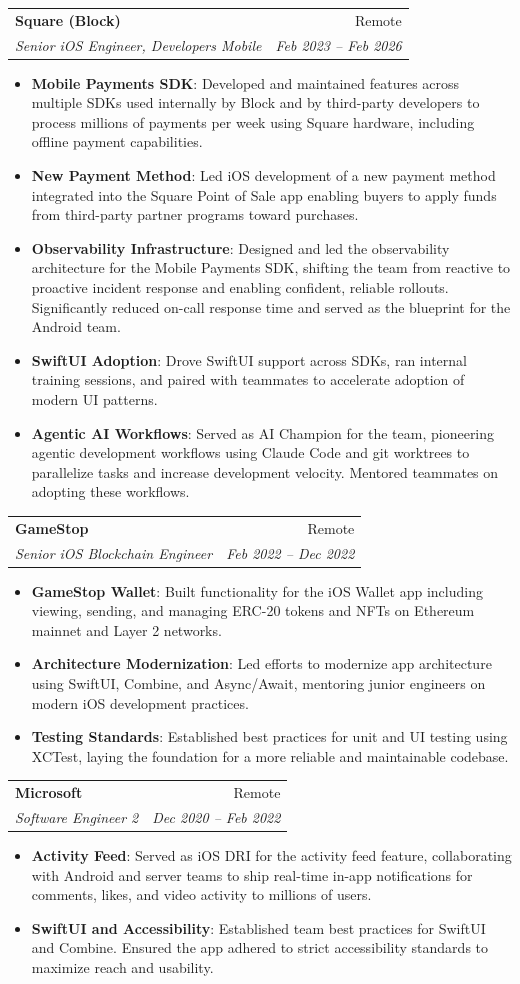 \documentclass[a4paper,20pt]{article}
\makeatletter
\newcommand{\resumeItem}[2]{
  \item\small{
    \textbf{#1}{: #2 \vspace{-2pt}}
  }
}
\newcommand{\resumeSubheading}[4]{
  \vspace{-1pt}\item
    \begin{tabular*}{0.97\textwidth}{l@{\extracolsep{\fill}}r}
      \textbf{#1} & #2 \\
      \textit{#3} & \textit{#4} \\
    \end{tabular*}\vspace{-5pt}
}
\newcommand{\resumeItemListStart}{\begin{itemize}}
\newcommand{\resumeItemListEnd}{\end{itemize}}
\makeatother
\begin{document}
    \resumeSubheading{Square (Block)}{Remote}
    {Senior iOS Engineer, Developers Mobile}{Feb 2023 -- Feb 2026}
    \resumeItemListStart
        \resumeItem{Mobile Payments SDK}
          {Developed and maintained features across multiple SDKs used internally by Block and by third-party developers to process millions of payments per week using Square hardware, including offline payment capabilities.}
        \resumeItem{New Payment Method}
          {Led iOS development of a new payment method integrated into the Square Point of Sale app enabling buyers to apply funds from third-party partner programs toward purchases.}
        \resumeItem{Observability Infrastructure}
          {Designed and led the observability architecture for the Mobile Payments SDK, shifting the team from reactive to proactive incident response and enabling confident, reliable rollouts. Significantly reduced on-call response time and served as the blueprint for the Android team.}
        \resumeItem{SwiftUI Adoption}
          {Drove SwiftUI support across SDKs, ran internal training sessions, and paired with teammates to accelerate adoption of modern UI patterns.}
        \resumeItem{Agentic AI Workflows}
          {Served as AI Champion for the team, pioneering agentic development workflows using Claude Code and git worktrees to parallelize tasks and increase development velocity. Mentored teammates on adopting these workflows.}
    \resumeItemListEnd

    \resumeSubheading{GameStop}{Remote}
    {Senior iOS Blockchain Engineer}{Feb 2022 -- Dec 2022}
    \resumeItemListStart
        \resumeItem{GameStop Wallet}
          {Built functionality for the iOS Wallet app including viewing, sending, and managing ERC-20 tokens and NFTs on Ethereum mainnet and Layer 2 networks.}
        \resumeItem{Architecture Modernization}
          {Led efforts to modernize app architecture using SwiftUI, Combine, and Async/Await, mentoring junior engineers on modern iOS development practices.}
        \resumeItem{Testing Standards}
          {Established best practices for unit and UI testing using XCTest, laying the foundation for a more reliable and maintainable codebase.}
    \resumeItemListEnd

    \resumeSubheading{Microsoft}{Remote}
    {Software Engineer 2}{Dec 2020 -- Feb 2022}
    \resumeItemListStart
        \resumeItem{Activity Feed}
          {Served as iOS DRI for the activity feed feature, collaborating with Android and server teams to ship real-time in-app notifications for comments, likes, and video activity to millions of users.}
        \resumeItem{SwiftUI and Accessibility}
          {Established team best practices for SwiftUI and Combine. Ensured the app adhered to strict accessibility standards to maximize reach and usability.}
    \resumeItemListEnd
\end{document}
